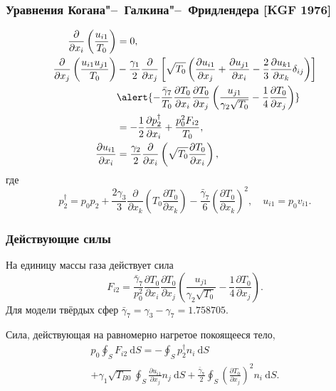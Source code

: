 \documentclass[mathserif]{beamer} %
\newcommand{\dd}{\:\mathrm{d}}
\newcommand{\pder}[2][]{\frac{\partial#1}{\partial#2}}
\begin{document}
\begin{frame}
    \frametitle{Уравнения Когана"--~Галкина"--~Фридлендера [KGF 1976]}
    \begin{align}
        \pder{x_i}\left(\frac{u_{i1}}{T_0}\right) &= 0, \label{eq:asymptotic1} \\
        \pder{x_j}\left(\frac{u_{i1}u_{j1}}{T_0}\right)
            &-\frac{\gamma_1}2\pder{x_j}\left[\sqrt{T_0}\left(
                \pder[u_{i1}]{x_j} + \pder[u_{j1}]{x_i} - \frac23\pder[u_{k1}]{x_k}\delta_{ij}
            \right)\right] \notag\\
            &\alert{- \frac{\bar{\gamma}_7}{T_0}\pder[T_0]{x_i}\pder[T_0]{x_j}
                \left(\frac{u_{j1}}{\gamma_2\sqrt{T_0}} - \frac{1}4\pder[T_0]{x_j}\right)} \notag\\
            &= -\frac12\pder[p_2^\dag]{x_i} + \frac{p_0^2 F_{i2}}{T_0}, \label{eq:asymptotic2} \\
        \pder[u_{i1}]{x_i} &= \frac{\gamma_2}2\pder{x_i}\left(\sqrt{T_0}\pder[T_0]{x_i}\right), \label{eq:asymptotic3}
    \end{align}
    где
    \begin{equation}\label{eq:dag_pressure}
        p_2^\dag = p_0 p_2
            + \frac{2\gamma_3}{3}\pder{x_k}\left(T_0\pder[T_0]{x_k}\right)
            - \frac{\bar{\gamma}_7}{6}\left(\pder[T_0]{x_k}\right)^2, \quad u_{i1} = p_0v_{i1}.
    \end{equation}
\end{frame}

\begin{frame}
    \frametitle{Действующие силы}
    На единицу массы газа действует сила
    \begin{equation}\label{eq:gamma7_force}
        F_{i2} = \frac{\bar{\gamma}_7}{p_0^2}\pder[T_0]{x_i}\pder[T_0]{x_j}\left(\frac{u_{j1}}{\gamma_2\sqrt{T_0}}
            - \frac{1}4\pder[T_0]{x_j}\right).
    \end{equation}
    Для модели твёрдых сфер \(\bar{\gamma}_7 = \gamma_3 - \gamma_7 = 1.758705\).
    \vspace{30pt}\pause

    Сила, действующая на равномерно нагретое покоящееся тело,
    \begin{multline}\label{eq:force:terms}
        p_0 \oint_S F_{i2} \dd{S} =
            - \oint_S p_2^\dag n_i \dd{S} \\
            + \gamma_1 \sqrt{T_{B0}} \oint_S \pder[u_{i1}]{x_j} n_j \dd{S}
            + \frac{\bar{\gamma}_7}{2} \oint_S \left(\pder[T_0]{x_j}\right)^2 n_i \dd{S}.
    \end{multline}
\end{frame}
\end{document}
